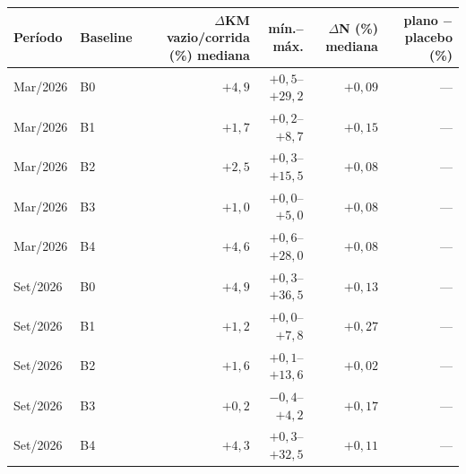 \begin{tabular}{llrrrr}
\hline
Período & Baseline & $\Delta$KM vazio/corrida (\%) mediana & mín.--máx. & $\Delta$N (\%) mediana & plano $-$ placebo (\%) \\
\hline
Mar/2026 & B0 & $+4{,}9$ & $+0{,}5$--$+29{,}2$ & $+0{,}09$ & --- \\
Mar/2026 & B1 & $+1{,}7$ & $+0{,}2$--$+8{,}7$ & $+0{,}15$ & --- \\
Mar/2026 & B2 & $+2{,}5$ & $+0{,}3$--$+15{,}5$ & $+0{,}08$ & --- \\
Mar/2026 & B3 & $+1{,}0$ & $+0{,}0$--$+5{,}0$ & $+0{,}08$ & --- \\
Mar/2026 & B4 & $+4{,}6$ & $+0{,}6$--$+28{,}0$ & $+0{,}08$ & --- \\
Set/2026 & B0 & $+4{,}9$ & $+0{,}3$--$+36{,}5$ & $+0{,}13$ & --- \\
Set/2026 & B1 & $+1{,}2$ & $+0{,}0$--$+7{,}8$ & $+0{,}27$ & --- \\
Set/2026 & B2 & $+1{,}6$ & $+0{,}1$--$+13{,}6$ & $+0{,}02$ & --- \\
Set/2026 & B3 & $+0{,}2$ & $-0{,}4$--$+4{,}2$ & $+0{,}17$ & --- \\
Set/2026 & B4 & $+4{,}3$ & $+0{,}3$--$+32{,}5$ & $+0{,}11$ & --- \\
\hline
\end{tabular}
